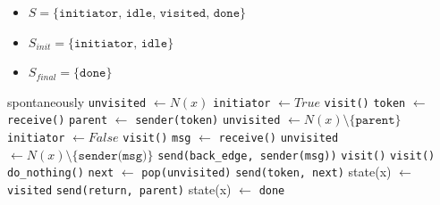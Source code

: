 \begin{itemize}
    \item $S = \{\texttt{initiator, idle, visited, done}\}$
    \item $S_{init} = \{\texttt{initiator, idle}\}$
    \item $S_{final} = \{\texttt{done}\}$
\end{itemize}

\begin{algorithm}
\caption{Protocollo BACK}
\begin{algorithmic}[1]
     spontaneously
        \State \texttt{unvisited} $\gets N(x)$
        \State \texttt{initiator} $\gets True$
        \State \texttt{visit()}
    \EndIf
    \State
        \State \texttt{token} $\gets$ \texttt{receive()}
        \State \texttt{parent} $\gets$ \texttt{sender(token)}
        \State \texttt{unvisited} $\gets N(x) \setminus \{\texttt{parent}\}$
        \State \texttt{initiator} $\gets False$
        \State \texttt{visit()}
    \EndIf
    \State
        \State \texttt{msg} $\gets$ \texttt{receive()}
            \State \texttt{unvisited} $\gets N(x) \setminus \{\texttt{sender(msg)}\}$
            \State \texttt{send(back\_edge, sender(msg))}
            \State \texttt{visit()}
            \State \texttt{visit()}
        \EndIf
    \EndIf
    \State
        \State \texttt{do\_nothing()}
    \EndIf
    \State
            \State \texttt{next} $\gets$ \texttt{pop(unvisited)}
            \State \texttt{send(token, next)}
            \State state(x) $\gets$ \texttt{visited}
        \Else
                \State \texttt{send(return, parent)}
            \EndIf
            \State state(x) $\gets$ \texttt{done}
        \EndIf
    \EndProcedure
\end{algorithmic}
\end{algorithm}

